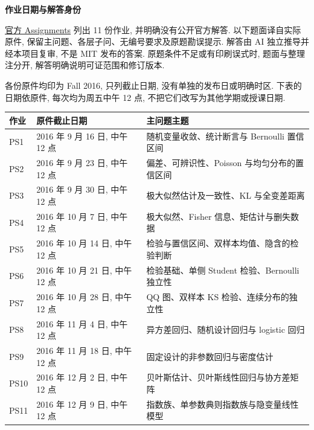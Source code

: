 \noindent\textbf{作业日期与解答身份}\par
\href{https://ocw.mit.edu/courses/18-650-statistics-for-applications-fall-2016/pages/assignments/}{官方 Assignments} 列出 11 份作业, 并明确没有公开官方解答. 以下题面译自实际原件, 保留主问题、各层子问、无编号要求及原题勘误提示. 解答由 AI 独立推导并经本项目复审, 不是 MIT 发布的答案. 原题条件不足或有印刷误式时, 题面与整理注分开, 解答明确说明可证范围和修订版本.

各份原件均印为 Fall 2016, 只列截止日期, 没有单独的发布日或明确时区. 下表的日期依原件, 每次均为周五中午 12 点, 不把它们改写为其他学期或授课日期.
\begin{longtable}{@{}p{2cm}p{6.5cm}p{8.2cm}@{}}
\toprule
作业 & 原件截止日期 & 主问题主题\\
\midrule
PS1 & 2016 年 9 月 16 日, 中午 12 点 & 随机变量收敛、统计断言与 Bernoulli 置信区间\\
PS2 & 2016 年 9 月 23 日, 中午 12 点 & 偏差、可辨识性、Poisson 与均匀分布的置信区间\\
PS3 & 2016 年 9 月 30 日, 中午 12 点 & 极大似然估计及一致性、KL 与全变差距离\\
PS4 & 2016 年 10 月 7 日, 中午 12 点 & 极大似然、Fisher 信息、矩估计与删失数据\\
PS5 & 2016 年 10 月 14 日, 中午 12 点 & 检验与置信区间、双样本均值、隐含的检验判断\\
PS6 & 2016 年 10 月 21 日, 中午 12 点 & 检验基础、单侧 Student 检验、Bernoulli 独立性\\
PS7 & 2016 年 10 月 28 日, 中午 12 点 & QQ 图、双样本 KS 检验、连续分布的独立性\\
PS8 & 2016 年 11 月 4 日, 中午 12 点 & 异方差回归、随机设计回归与 logistic 回归\\
PS9 & 2016 年 11 月 18 日, 中午 12 点 & 固定设计的非参数回归与密度估计\\
PS10 & 2016 年 12 月 2 日, 中午 12 点 & 贝叶斯估计、贝叶斯线性回归与协方差矩阵\\
PS11 & 2016 年 12 月 9 日, 中午 12 点 & 指数族、单参数典则指数族与隐变量线性模型\\
\bottomrule
\end{longtable}
